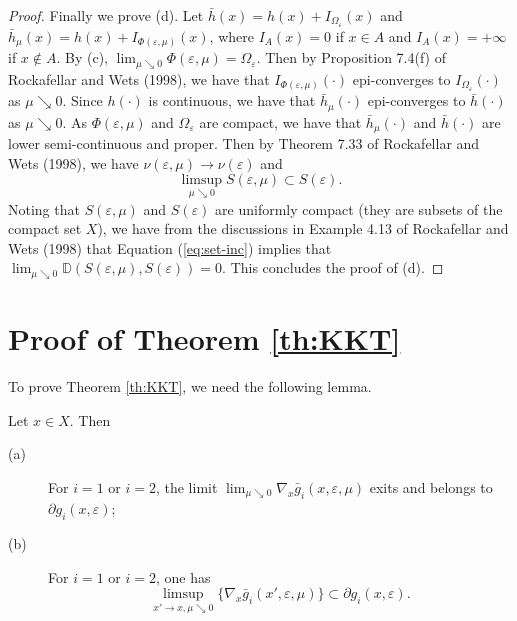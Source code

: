 \begin{proof}
Finally we prove (d). Let
$\bar{h}(x)=h(x)+I_{\Omega_\varepsilon}(x)$ and
$\bar{h}_{\mu}(x)=h(x)+I_{\Phi(\varepsilon,\mu)}(x)$, where
$I_{A}(x)=0$ if $x\in A$ and $I_{A}(x)=+\infty$ if $x\not\in A$. By
(c), $\lim_{\mu\searrow 0}\Phi(\varepsilon,\mu)=\Omega_\varepsilon$.
Then by Proposition 7.4(f) of Rockafellar and Wets (1998), we have
that $I_{\Phi(\varepsilon,\mu)}(\cdot)$ epi-converges to
$I_{\Omega_\varepsilon}(\cdot)$ as $\mu\searrow 0$. Since $h(\cdot)$
is continuous, we have that $\bar{h}_{\mu} (\cdot)$ epi-converges to
$\bar{h}(\cdot)$ as $\mu\searrow 0$. As $\Phi(\varepsilon,\mu)$ and
$\Omega_\varepsilon$ are compact, we have that
$\bar{h}_{\mu}(\cdot)$ and $\bar{h} (\cdot)$ are lower
semi-continuous and proper. Then by Theorem 7.33 of Rockafellar and
Wets (1998), we have
$\nu(\varepsilon,\mu)\rightarrow\nu(\varepsilon)$ and
\begin{equation}\label{eq:set-inc}
\displaystyle \limsup_{\mu\searrow 0}S(\varepsilon,\mu)\subset
S(\varepsilon).
\end{equation}
Noting that $S(\varepsilon,\mu)$ and $S(\varepsilon)$ are uniformly
compact (they are subsets of the compact set $X$), we have from the
discussions in Example 4.13 of Rockafellar and Wets (1998) that
Equation (\ref{eq:set-inc}) implies that $\lim_{\mu\searrow 0}
\mathbb{D}(S(\varepsilon,\mu),S(\varepsilon))=0$. This concludes the
proof of (d).
\end{proof}




\section{Proof of Theorem \ref{th:KKT}}

To prove Theorem \ref{th:KKT}, we need the following lemma.

\begin{lemma}\label{lem:diffs}
Let $x\in X$. Then
\begin{description}
\item[(a)] For $i=1$ or $i=2$, the limit
$\lim_{\mu\searrow 0}\nabla_x\bar g_i(x,\varepsilon,\mu)$ exits and
belongs to $\partial g_i (x,\varepsilon)$;
\item[(b)] For $i=1$ or $i=2$, one has
\begin{equation}\label{eq:diff-inclusion}
\displaystyle \limsup_{x' \rightarrow x, \mu \searrow
0}\Big\{\nabla_x\bar g_i(x',\varepsilon,\mu)\Big\}\subset
\partial g_i(x,\varepsilon).
\end{equation}
\end{description}
\end{lemma}

